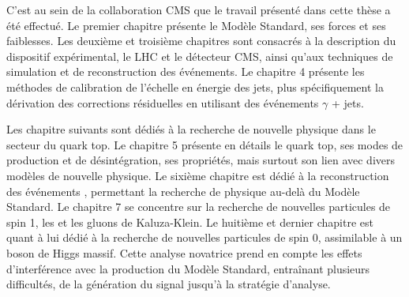 \bigskip

C'est au sein de la collaboration CMS que le travail présenté dans cette thèse a été effectué. Le premier chapitre présente le Modèle Standard, ses forces et ses faiblesses. Les deuxième et troisième chapitres sont consacrés à la description du dispositif expérimental, le LHC et le détecteur CMS, ainsi qu'aux techniques de simulation et de reconstruction des événements. Le chapitre 4 présente les méthodes de calibration de l'échelle en énergie des jets, plus spécifiquement la dérivation des corrections résiduelles en utilisant des événements $\gamma$ + jets.

\medskip

Les chapitre suivants sont dédiés à la recherche de nouvelle physique dans le secteur du quark top. Le chapitre 5 présente en détails le quark top, ses modes de production et de désintégration, ses propriétés, mais surtout son lien avec divers modèles de nouvelle physique. Le sixième chapitre est dédié à la reconstruction des événements \ttbar, permettant la recherche de physique au-delà du Modèle Standard. Le chapitre 7 se concentre sur la recherche de nouvelles particules de spin 1, les \zprime et les gluons de Kaluza-Klein. Le huitième et dernier chapitre est quant à lui dédié à la recherche de nouvelles particules de spin 0, assimilable à un boson de Higgs massif. Cette analyse novatrice prend en compte les effets d'interférence avec la production du Modèle Standard, entraînant plusieurs difficultés, de la génération du signal jusqu'à la stratégie d'analyse.